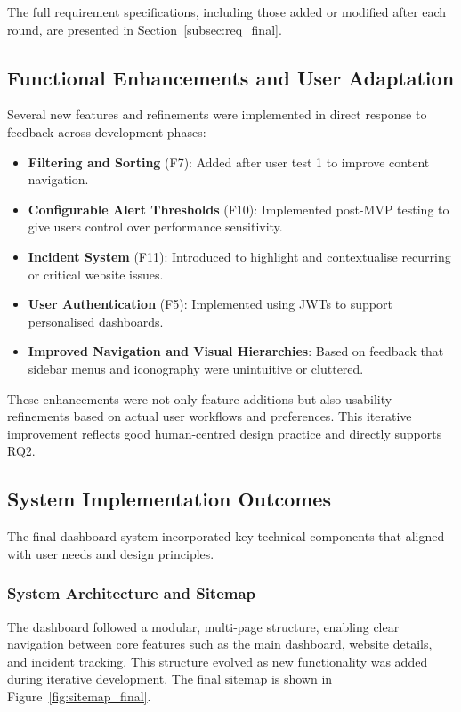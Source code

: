 The full requirement specifications, including those added or modified after each round, are presented in Section~\ref{subsec:req_final}.


\subsection{Functional Enhancements and User Adaptation}
Several new features and refinements were implemented in direct response to feedback across development phases:

\begin{itemize}
    \item \textbf{Filtering and Sorting} (F7): Added after user test 1 to improve content navigation.
    \item \textbf{Configurable Alert Thresholds} (F10): Implemented post-MVP testing to give users control over performance sensitivity.
    \item \textbf{Incident System} (F11): Introduced to highlight and contextualise recurring or critical website issues.
    \item \textbf{User Authentication} (F5): Implemented using JWTs to support personalised dashboards.
    \item \textbf{Improved Navigation and Visual Hierarchies}: Based on feedback that sidebar menus and iconography were unintuitive or cluttered.
\end{itemize}

These enhancements were not only feature additions but also usability refinements based on actual user workflows and preferences. This iterative improvement reflects good human-centred design practice and directly supports RQ2.


\subsection{System Implementation Outcomes}
\label{subsec:sys_implement_outcomes_results}
The final dashboard system incorporated key technical components that aligned with user needs and design principles.

\subsubsection{System Architecture and Sitemap}
The dashboard followed a modular, multi-page structure, enabling clear navigation between core features such as the main dashboard, website details, and incident tracking. This structure evolved as new functionality was added during iterative development. The final sitemap is shown in Figure~\ref{fig:sitemap_final}.

